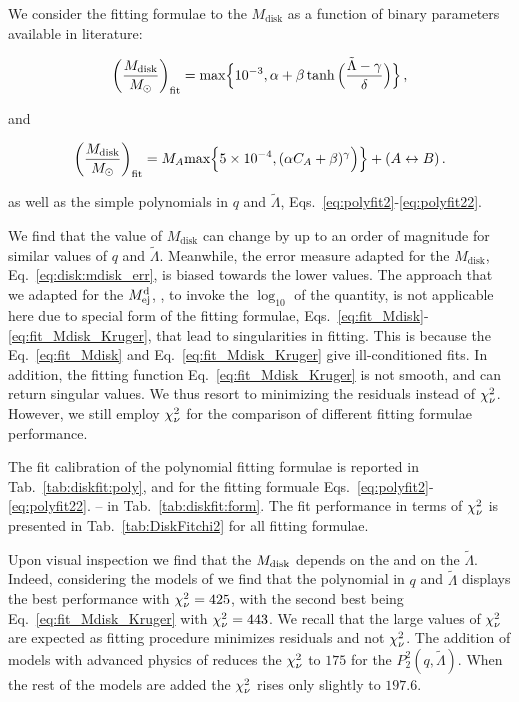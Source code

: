 We consider the fitting formulae to the $M_{\text{disk}}$ as a function of binary parameters 
available in literature: \citep{Radice:2018pdn}

\begin{equation}
\left(\frac{M_{\rm{disk}}}{M_{\odot}}\right)_{\rm fit} = \text{max}\Big\{10^{-3}, \alpha + \beta \tanh\Big(\frac{\tilde{\Lambda}-\gamma}{\delta}\Big)\Big\}\,,
\label{eq:fit_Mdisk}
\end{equation}

and \citep{Kruger:2020gig}

\begin{equation}
\left(\frac{M_{\rm{disk}}}{M_{\odot}}\right)_{\rm fit} =
M_A\text{max}\Big\{5\times 10^{-4}, (\alpha C_A + \beta)^\gamma
\Big)\Big\}
+ (A\leftrightarrow B)\,.
\label{eq:fit_Mdisk_Kruger}
\end{equation}

as well as the simple polynomials in $q$ and $\tilde{\Lambda}$, 
Eqs.~\eqref{eq:polyfit2}-\eqref{eq:polyfit22}.

We find that the value of $M_{\text{disk}}$ can change by up to an order of magnitude 
for similar values of $q$ and $\tilde{\Lambda}$. Meanwhile, the error measure adapted for the 
$M_{\text{disk}}$, Eq.~\eqref{eq:disk:mdisk_err}, is biased towards the lower values. 
The approach that we adapted for the $M^{\text{d}}_{\text{ej}}$, \ie, to invoke the $\log_{10}$ of the quantity, 
is not applicable here due to special form of the fitting formulae,  
Eqs.~\eqref{eq:fit_Mdisk}-\eqref{eq:fit_Mdisk_Kruger}, that lead to singularities in fitting.
This is because the Eq.~\eqref{eq:fit_Mdisk} and Eq.~\eqref{eq:fit_Mdisk_Kruger} give
ill-conditioned fits. In addition, the fitting function Eq.~\eqref{eq:fit_Mdisk_Kruger} 
is not smooth, and can return singular values.
We thus resort to minimizing the residuals instead of $\chi_{\nu}^2$. However, we still employ 
$\chi_{\nu}^2$ for the comparison of different fitting formulae performance. 

The fit calibration of the polynomial fitting formulae is reported in 
Tab.~\ref{tab:diskfit:poly}, and for the fitting formuale 
Eqs.~\eqref{eq:polyfit2}-\eqref{eq:polyfit22}. -- in Tab.~\ref{tab:diskfit:form}.
The fit performance in terms of $\chi_{\nu}^2$ is presented in Tab.~\ref{tab:DiskFitchi2} for all
fitting formulae. 

Upon visual inspection we find that the $M_{\rm disk}$ depends on the \mr{} 
and on the $\tilde{\Lambda}$. Indeed, considering the models of \DSrefset{} we find that the 
polynomial in $q$ and $\tilde{\Lambda}$ displays the best performance with $\chi_{\nu}^2=425$, with
the second best being Eq.~\eqref{eq:fit_Mdisk_Kruger} with $\chi_{\nu}^2=443$.
We recall that the large values of $\chi_{\nu}^2$ are expected as fitting procedure minimizes 
residuals and not $\chi_{\nu}^2$.
The addition of models with advanced physics of \DSheatcool{} reduces the $\chi_{\nu}^2$ to 
$175$ for the $P_2^2(q,\tilde{\Lambda})$. When the rest of the models are added 
the $\chi_{\nu}^2$ rises only slightly to $197.6$.

